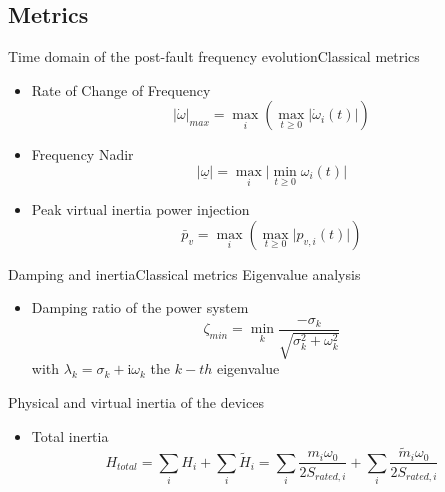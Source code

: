 \documentclass[aspectratio=169, 12pt]{beamer}
\begin{document}
\subsection{Metrics}
\begin{frame}{Time domain of the post-fault frequency evolution}{Classical metrics}
  \begin{itemize}[<+(1)->]
    \item Rate of Change of Frequency
    \begin{equation}
      \lvert \dot{\omega} \rvert _{max} = \max_i\left(\max_{t\ge0}\lvert \dot{\omega}_i(t) \rvert\right)
    \end{equation}
    
    \item Frequency Nadir
    \begin{equation}
      \lvert \underline{\omega} \rvert = \max_i\lvert\min_{t\ge0} \omega_i(t) \rvert
    \end{equation}
    \item Peak virtual inertia power injection
    \begin{equation}
      \bar{p}_v = \max_i\left(\max_{t\ge0}\lvert p_{v,i}(t) \rvert\right)
    \end{equation}
  \end{itemize}
\end{frame}

\begin{frame}{Damping and inertia}{Classical metrics}
  Eigenvalue analysis
  \begin{itemize}
    \item Damping ratio of the power system
    \begin{equation}
      \zeta_{min} = \min_{k}\frac{-\sigma_k}{\sqrt{\sigma_k^2 + \omega_k^2}}
    \end{equation}
    with $\lambda_k=\sigma_k + \text{i}\omega_k$ the $k-th$ eigenvalue
  \end{itemize}
  
  Physical and virtual inertia of the devices
\begin{itemize}
  \item Total inertia
  \begin{equation}
    H_{total} = \sum_{i}H_i + \sum_{i} \tilde{H}_i = \sum_{i}\frac{m_i \omega_0}{2 S_{rated,i}} + \sum_{i} \frac{\tilde{m}_i \omega_0}{2 S_{rated,i}}
  \end{equation} 
\end{itemize}
\end{frame}
\end{document}
